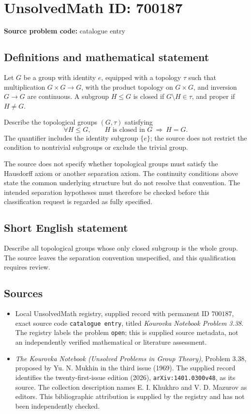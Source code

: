 \documentclass[11pt]{article}
\begin{document}
\section*{UnsolvedMath ID: 700187}
\textbf{Source problem code:} catalogue entry
\subsection{Definitions and mathematical statement}
Let \(G\) be a group with identity \(e\), equipped with a topology \(\tau\) such that multiplication \(G\times G\to G\), with the product topology on \(G\times G\), and inversion \(G\to G\) are continuous. A subgroup \(H\leq G\) is closed if \(G\setminus H\in\tau\), and proper if \(H\ne G\).

Describe the topological groups \((G,\tau)\) satisfying
\[
\forall H\leq G,\qquad H\text{ is closed in }G\ \Longrightarrow\ H=G.
\]
The quantifier includes the identity subgroup \(\{e\}\); the source does not restrict the condition to nontrivial subgroups or exclude the trivial group.

The source does not specify whether topological groups must satisfy the Hausdorff axiom or another separation axiom. The continuity conditions above state the common underlying structure but do not resolve that convention. The intended separation hypotheses must therefore be checked before this classification request is regarded as fully specified.
\subsection{Short English statement}
Describe all topological groups whose only closed subgroup is the whole group. The source leaves the separation convention unspecified, and this qualification requires review.
\subsection{Sources}
\begin{itemize}
\item Local UnsolvedMath registry, supplied record with permanent ID \(700187\), exact source code \texttt{catalogue entry}, titled \emph{Kourovka Notebook Problem 3.38}. The registry labels the problem \texttt{open}; this is supplied source metadata, not an independently verified mathematical or literature assessment.
\item \emph{The Kourovka Notebook (Unsolved Problems in Group Theory)}, Problem 3.38, proposed by Yu. N. Mukhin in the third issue (1969). The supplied record identifies the twenty-first-issue edition (2026), \texttt{arXiv:1401.0300v48}, as its source. The collection description names E. I. Khukhro and V. D. Mazurov as editors. This bibliographic attribution is supplied by the registry and has not been independently checked.
\end{itemize}
\end{document}
